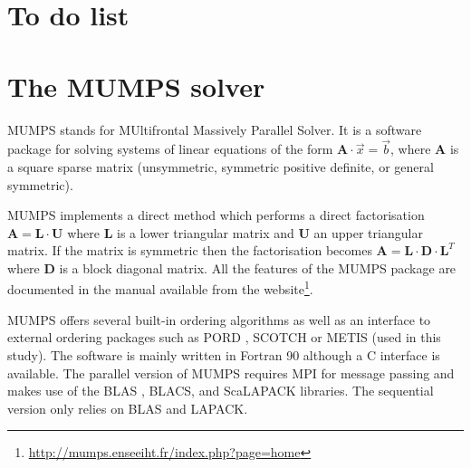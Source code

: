 \begin{center}

\end{center}

\section{To do list}



\section{The MUMPS solver}

MUMPS stands for MUltifrontal Massively Parallel Solver. It is a software package 
for solving systems of linear equations of the 
form ${\bm A}\cdot{\vec x} = {\vec b}$, where ${\bm A}$ is a square sparse matrix (unsymmetric, 
symmetric positive definite, or general symmetric). 

MUMPS implements a direct method which performs a direct factorisation
${\bm A} = {\bm L}\cdot{\bm U}$ where ${\bm L}$ is a lower triangular matrix and ${\bm U}$ 
an upper triangular matrix. If the matrix is symmetric then the factorisation becomes
${\bm A} = {\bm L}\cdot{\bm D}\cdot{\bm L}^T$
where ${\bm D}$ is a block diagonal matrix. 
All the features of the MUMPS package are documented in the manual available from the 
website\footnote{\url{http://mumps.enseeiht.fr/index.php?page=home}}.


MUMPS offers several built-in ordering algorithms as well as an 
interface to external ordering packages such as PORD \cite{schu01}, SCOTCH \cite{pell07} 
or METIS \cite{kaku98} (used in this study). 
The software is mainly written in Fortran 90 although a C interface is available. 
The parallel version of MUMPS requires 
MPI \cite{snoh96} for message passing and makes use of the BLAS \cite{dodd90a,dodd90b}, BLACS, and ScaLAPACK
\cite{blcc97} libraries. 
The sequential version only relies on BLAS and LAPACK.

